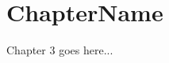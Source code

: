 \documentclass{standalone}
\begin{document}
\chapter{ChapterName}
Chapter 3 goes here...
\end{document}
